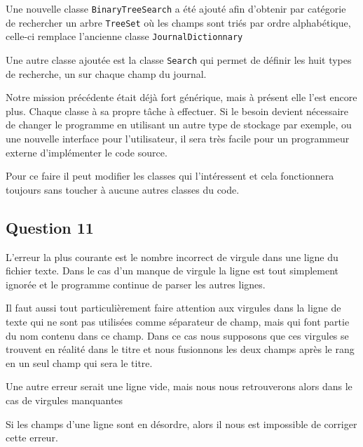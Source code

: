 \documentclass[11pt]{article}
\begin{document}
Une nouvelle classe \verb+BinaryTreeSearch+ a été ajouté afin d'obtenir par catégorie de rechercher un arbre \verb+TreeSet+ où les champs sont triés par ordre alphabétique, celle-ci remplace l'ancienne classe \verb+JournalDictionnary+

Une autre classe ajoutée est la classe \verb+Search+ qui permet de définir les huit types de recherche, un sur chaque champ du journal.

Notre mission précédente était déjà fort générique, mais à présent elle l'est encore plus. Chaque classe à sa propre tâche à effectuer. Si le besoin devient nécessaire de changer le programme en utilisant un autre type de stockage par exemple, ou une nouvelle interface pour l'utilisateur, il sera très facile pour un programmeur externe d'implémenter le code source.

Pour ce faire il peut modifier les classes qui l'intéressent et cela fonctionnera toujours sans toucher à aucune autres classes du code.

\subsection*{Question 11}

L'erreur la plus courante est le nombre incorrect de virgule dans une ligne du fichier texte. Dans le cas d'un manque de virgule la ligne est tout simplement ignorée et le programme continue de parser les autres lignes.

Il faut aussi tout particulièrement faire attention aux virgules dans la ligne de texte qui ne sont pas utilisées comme séparateur de champ, mais qui font partie du nom contenu dans ce champ.
Dans ce cas nous supposons que ces virgules se trouvent en réalité dans le titre et nous fusionnons les deux champs après le rang en un seul champ qui sera le titre.

Une autre erreur serait une ligne vide, mais nous nous retrouverons alors dans le cas de virgules manquantes

Si les champs d'une ligne sont en désordre, alors il nous est impossible de corriger cette erreur.
\end{document}
